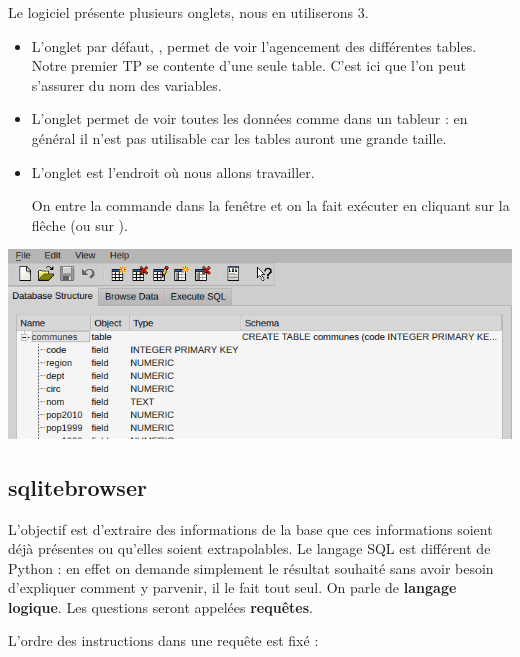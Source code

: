 Le logiciel présente plusieurs onglets,  nous en utiliserons 3.
\begin{itemize}
\item L'onglet par défaut, , permet de voir l'agencement des différentes tables. Notre premier TP se contente d'une seule table.
C'est ici que l'on peut s'assurer du nom des variables.
\item L'onglet  permet de voir toutes les données comme dans un tableur : en général il n'est pas utilisable car les tables auront une grande taille.
\item L'onglet  est l'endroit où nous allons travailler.

On entre la commande dans la fenêtre  et on la fait exécuter en cliquant sur la flêche (ou sur \type{[F5]}).
\end{itemize}
\begin{center}
\includegraphics[scale=0.4]{Images/14_figure1}
\end{center}
\subsection{sqlitebrowser}
L'objectif est d'extraire des informations de la base que ces informations soient déjà présentes ou qu'elles soient extrapolables. Le langage SQL est différent de Python : en effet on demande simplement le résultat souhaité sans avoir besoin d'expliquer comment y parvenir, il le fait tout seul. On parle de {\bf langage logique}. Les questions seront appelées {\bf requêtes}.

L'ordre des instructions dans une requête est fixé :

